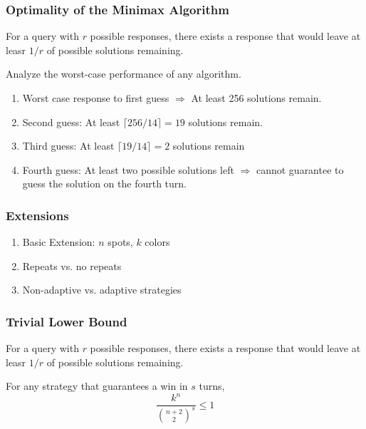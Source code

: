 \documentclass{beamer}
\begin{document}
    \begin{frame}
    	\frametitle{Optimality of the Minimax Algorithm}
	\begin{tcolorbox}[colback=blue!5,colframe=blue!40!black,title=Lemma (Pigeonhole Principle)]
	For a query with $r$ possible responses, there exists a response that would leave at leasr $1/r$ of possible solutions remaining.
	\end{tcolorbox}
	Analyze the worst-case performance of any algorithm. \\
		\begin{enumerate}[label=\roman*.]
		\item Worst case response to first guess $\Rightarrow$ At least 256 solutions remain.
		\item Second guess:  At least $\lceil 256/14 \rceil = 19$ solutions remain.
		\item Third guess: At least $\lceil 19/14 \rceil = 2$ solutions remain
		\item Fourth guess: At least two possible solutions left $\Rightarrow$ cannot guarantee to guess the solution on the fourth turn.
		\end{enumerate}
    \end{frame}

    \begin{frame}
    	\frametitle{Extensions}
		\begin{enumerate}[label=\roman*.]
		\item Basic Extension: $n$ spots, $k$ colors
		\item Repeats vs. no repeats
		\item Non-adaptive vs. adaptive strategies
		\end{enumerate}
    \end{frame}
    
    \begin{frame}
    \frametitle{Trivial Lower Bound}
	\begin{tcolorbox}[colback=blue!5,colframe=blue!40!black,title=Lemma (Pigeonhole Principle)]
	For a query with $r$ possible responses, there exists a response that would leave at leasr $1/r$ of possible solutions remaining.
	\end{tcolorbox}
    \begin{itemize}
    \end{itemize}
	\begin{tcolorbox}[colback=blue!5,colframe=blue!40!black,title=Theorem]
	For any strategy that guarantees a win in $s$ turns, \\
	\begin{equation*}
	\frac{k^n}{\binom{n+2}{2}^s} \leq 1
	\end{equation*}
	\end{tcolorbox}

    \end{frame}
\end{document}
